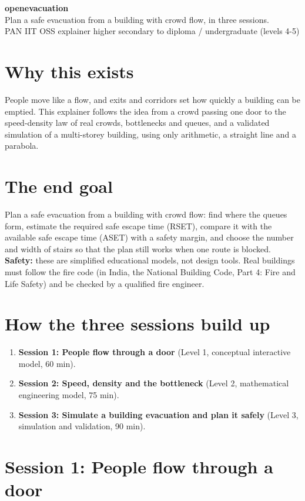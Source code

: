 \documentclass[11pt,a4paper]{article}
\begin{document}
\begin{center}{\LARGE\bfseries openevacuation}\\[0.4em]{\large Plan a safe evacuation from a building with crowd flow, in three sessions.}\\[0.2em]\small PAN IIT OSS explainer \textbullet{} higher secondary to diploma / undergraduate (levels 4-5)\end{center}

\section*{Why this exists}
People move like a flow, and exits and corridors set how quickly a building can be emptied. This explainer follows the idea from a crowd passing one door to the speed-density law of real crowds, bottlenecks and queues, and a validated simulation of a multi-storey building, using only arithmetic, a straight line and a parabola.

\section*{The end goal}
Plan a safe evacuation from a building with crowd flow: find where the queues form, estimate the required safe escape time (RSET), compare it with the available safe escape time (ASET) with a safety margin, and choose the number and width of stairs so that the plan still works when one route is blocked. \textbf{Safety:} these are simplified educational models, not design tools. Real buildings must follow the fire code (in India, the National Building Code, Part 4: Fire and Life Safety) and be checked by a qualified fire engineer.

\section*{How the three sessions build up}
\begin{enumerate}[nosep]
\item \textbf{Session 1: People flow through a door} (Level 1, conceptual interactive model, 60 min).
\item \textbf{Session 2: Speed, density and the bottleneck} (Level 2, mathematical engineering model, 75 min).
\item \textbf{Session 3: Simulate a building evacuation and plan it safely} (Level 3, simulation and validation, 90 min).
\end{enumerate}

\section{Session 1: People flow through a door}
\end{document}
